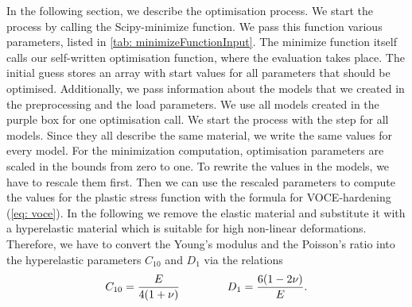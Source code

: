 In the following section, we describe the optimisation process. We start the process by calling the Scipy-minimize function. We pass this function various parameters, listed in \autoref{tab: minimizeFunctionInput}. The minimize function itself calls our self-written optimisation function, where the evaluation takes place. The initial guess stores an array with start values for all parameters that should be optimised. Additionally, we pass information about the models that we created in the preprocessing and the load parameters. We use all models created in the purple box for one optimisation call.
We start the process with the step  for all models. Since they all describe the same material, we write the same values for every model. For the minimization computation, optimisation parameters are scaled in the bounds from zero to one. To rewrite the values in the models, we have to rescale them first. Then we can use the rescaled parameters to compute the values for the plastic stress function with the formula for VOCE-hardening (\autoref{eq: voce}). In the following we remove the elastic material and substitute it with a hyperelastic material which is suitable for high non-linear deformations. Therefore, we have to convert the Young's modulus and the Poisson's ratio into the hyperelastic parameters $C_{10}$ and $D_1$ via the relations
\begin{gather}\label{eq: elasticParams}
    C_{10} = \frac{E}{4(1+ \nu)} \hspace{1.5cm}
    D_1 = \frac{6(1-2\nu)}{E}.
\end{gather}


